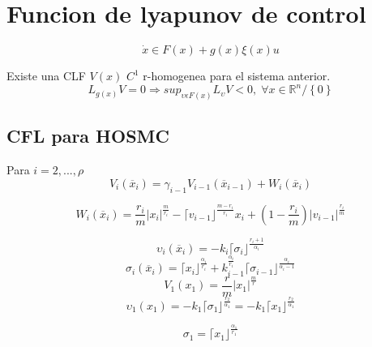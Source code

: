 \section{Funcion de lyapunov de control}
    \begin{equation*}\label{3}
        \dot{x}\in F(x)+g(x)\xi(x)u
       \end{equation*}
    
    Existe una CLF $V(x)$ $C^1$ r-homogenea para el sistema anterior.
    \begin{equation*}
    L_{g(x)}V=0\Rightarrow sup_{\upsilon \epsilon F(x)}L_\upsilon V<0,\; \forall x \in  \mathbb{R}^{n} /\left\lbrace 0 \right\rbrace
    \end{equation*}

\subsection{CFL para HOSMC}
    Para $i=2,...,\rho$
    \begin{equation}
    V_i(\overline{x} _i)=\gamma_{i-1}V_{i-1}(\overline{x}_{i-1})+W_i(\overline{x}_i)
    \end{equation}
    
    \begin{equation}
    W_i(\overline{x}_i)=\frac{r_i}{m} |x_i|^{\frac{m}{r_i}}-\lceil v_{i-1}\rfloor^{\frac{m-r_i}{r_i}}x_i+(1-\frac{r_i}{m})|v_{i-1}|^{\frac{r_i}{m}}
    \end{equation}
    
    \begin{equation}
    \upsilon_i(\overline{x}_i)=-k_i\lceil \sigma_i \rfloor^{\frac{r_i+1}{\alpha_i}}
    \end{equation}
    \begin{equation}
    \sigma_i(\overline{x}_i)=\lceil x_i \rfloor^{\frac{\alpha_i}{r_i}}+k_{i-1}^{\frac{\alpha_i}{r_i}}\lceil \sigma_{i-1} \rfloor^{\frac{\alpha_i}{\alpha_i-1}}
    \end{equation}
    \begin{equation}
    V_1(x_1)= \frac{r}{m}|x_1|^{\frac{m}{r}}
    \end{equation}
    \begin{equation}
    \upsilon_1(x_1)=-k_1\lceil \sigma_1 \rfloor^{\frac{r_2}{\alpha_1}}=-k_1\lceil x_1 \rfloor^{\frac{r_2}{\alpha_1}}
    \end{equation}
    
    \begin{equation}
    \sigma_1=\lceil x_1 \rfloor^{\frac{\alpha_1}{r_1}}
    \end{equation}
    
